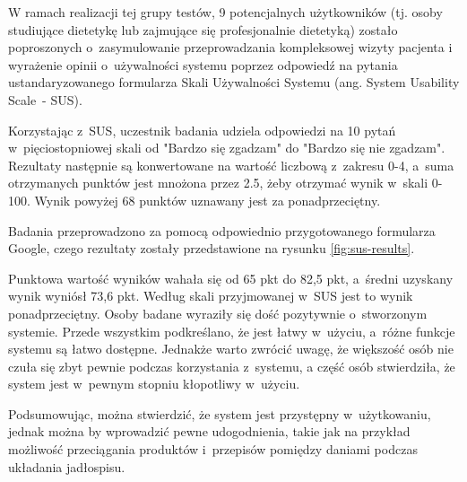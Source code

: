 \par
W ramach realizacji tej grupy testów, 9 potencjalnych użytkowników (tj. osoby studiujące dietetykę lub zajmujące się profesjonalnie dietetyką)
zostało poproszonych o~zasymulowanie przeprowadzania kompleksowej wizyty pacjenta
i wyrażenie opinii o~używalności systemu poprzez odpowiedź na pytania ustandaryzowanego formularza Skali Używalności Systemu (ang. System Usability Scale~- SUS)\cite{url:sus}.

\par
Korzystając z~SUS, uczestnik badania udziela odpowiedzi na 10 pytań w~pięciostopniowej skali od "Bardzo się zgadzam" do "Bardzo się nie zgadzam".
Rezultaty następnie są konwertowane na wartość liczbową z~zakresu 0-4, a~suma otrzymanych punktów jest mnożona przez 2.5, żeby otrzymać wynik w~skali 0-100.
Wynik powyżej 68 punktów uznawany jest za ponadprzeciętny.
\par
Badania przeprowadzono za pomocą odpowiednio przygotowanego formularza Google\cite{tech:google-forms}, czego rezultaty zostały przedstawione na rysunku \ref{fig:sus-results}.
%
%


Punktowa wartość wyników wahała się od 65 pkt do 82,5 pkt, a~średni uzyskany wynik wyniósł 73,6 pkt.
Według skali przyjmowanej w~SUS jest to wynik ponadprzeciętny.
Osoby badane wyraziły się dość pozytywnie o~stworzonym systemie.
Przede wszystkim podkreślano, że jest łatwy w~użyciu, a~różne funkcje systemu są łatwo dostępne.
Jednakże warto zwrócić uwagę, że większość osób nie czuła się zbyt pewnie podczas korzystania z~systemu,
a część osób stwierdziła, że system jest w~pewnym stopniu kłopotliwy w~użyciu.

\par
Podsumowując, można stwierdzić, że system jest przystępny w~użytkowaniu, jednak można by wprowadzić pewne udogodnienia,
takie jak na przykład możliwość przeciągania produktów i~przepisów pomiędzy daniami podczas układania jadłospisu.

\thispagestyle{normal}
